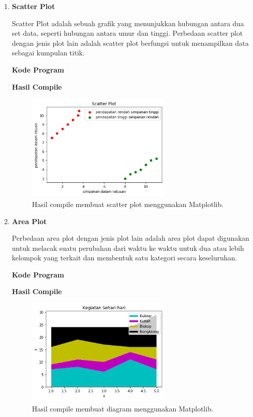 \begin{enumerate}
	\item \textbf{Scatter Plot}
	
	Scatter Plot adalah sebuah grafik yang menunjukkan hubungan antara dua set data, seperti hubungan antara umur dan tinggi. Perbedaan scatter plot dengan jenis plot lain adalah scatter plot berfungsi untuk menampilkan data sebagai kumpulan titik.
	
	\textbf{Kode Program}
	
	
	
	\textbf{Hasil Compile}
	
	\begin{figure}[H]
		\includegraphics[width=7cm]{figures/6/1144124/scatter.png}
		\centering
		\caption{Hasil compile membuat scatter plot menggunakan Matplotlib.}
	\end{figure}
	
	\item \textbf{Area Plot}
	
	Perbedaan area plot dengan jenis plot lain adalah area plot dapat digunakan untuk melacak suatu perubahan dari waktu ke waktu untuk dua atau lebih kelompok yang terkait dan membentuk satu kategori secara keseluruhan.
	
	\textbf{Kode Program}
	
	
	
	\textbf{Hasil Compile}
	
	\begin{figure}[H]
		\includegraphics[width=7cm]{figures/6/1144124/area.png}
		\centering
		\caption{Hasil compile membuat diagram menggunakan Matplotlib.}
	\end{figure}
	

\end{enumerate}
